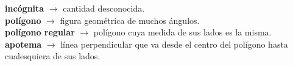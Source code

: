 \begin{defcard}
    \textbf{incógnita}	$\rightarrow$ cantidad desconocida.\\
    \textbf{polígono} $\rightarrow$ figura geométrica de muchos ángulos.\\
    \textbf{polígono regular} $\rightarrow$ polígono cuya medida de sus lados es la misma.\\
    \textbf{apotema} $\rightarrow$ línea perpendicular que va desde el centro del polígono hasta cualesquiera de sus lados.\\
\end{defcard}